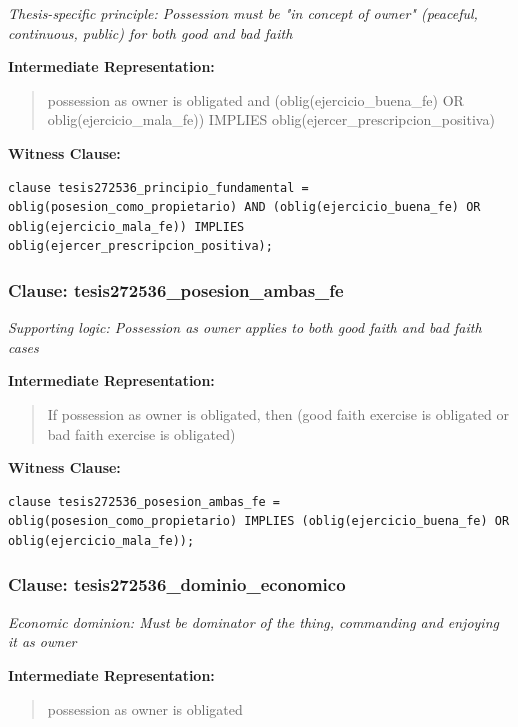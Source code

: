 \documentclass[11pt,a4paper]{article}
\begin{document}
\textit{Thesis-specific principle: Possession must be "in concept of owner" (peaceful, continuous, public) for both good and bad faith}

\textbf{Intermediate Representation:}

\begin{quote}
possession as owner is obligated and (oblig(ejercicio\_buena\_fe) OR oblig(ejercicio\_mala\_fe)) IMPLIES oblig(ejercer\_prescripcion\_positiva)
\end{quote}

\textbf{Witness Clause:}

\begin{lstlisting}[style=witnessstyle, language=Witness]
clause tesis272536_principio_fundamental = oblig(posesion_como_propietario) AND (oblig(ejercicio_buena_fe) OR oblig(ejercicio_mala_fe)) IMPLIES oblig(ejercer_prescripcion_positiva);
\end{lstlisting}

\subsubsection{Clause: tesis272536\_posesion\_ambas\_fe}

\textit{Supporting logic: Possession as owner applies to both good faith and bad faith cases}

\textbf{Intermediate Representation:}

\begin{quote}
If possession as owner is obligated, then (good faith exercise is obligated or bad faith exercise is obligated)
\end{quote}

\textbf{Witness Clause:}

\begin{lstlisting}[style=witnessstyle, language=Witness]
clause tesis272536_posesion_ambas_fe = oblig(posesion_como_propietario) IMPLIES (oblig(ejercicio_buena_fe) OR oblig(ejercicio_mala_fe));
\end{lstlisting}

\subsubsection{Clause: tesis272536\_dominio\_economico}

\textit{Economic dominion: Must be dominator of the thing, commanding and enjoying it as owner}

\textbf{Intermediate Representation:}

\begin{quote}
possession as owner is obligated
\end{quote}
\end{document}
